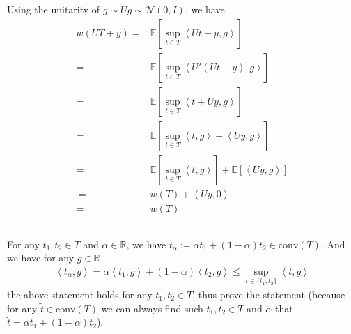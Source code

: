 \documentclass[11pt,a4paper]{ctexart}
\numberwithin{equation}{section}%
\begin{document}
    
\subsection{}

Using the unitarity of $ g \sim Ug \sim \mathcal{N}(0,I) $, we have
\begin{align*}
    w(UT+y)=& \mathbb{E}\left[ \mathop{ \sup  }\limits_{t\in T} \left\langle Ut+y, g \right\rangle   \right]  \\
    =& \mathbb{E}\left[ \mathop{ \sup  }\limits_{t\in T} \left\langle U'(Ut+y), g  \right\rangle   \right]  \\
    =& \mathbb{E}\left[ \mathop{ \sup  }\limits_{t\in T} \left\langle t + Uy, g  \right\rangle   \right]  \\
    =& \mathbb{E}\left[ \mathop{ \sup  }\limits_{t\in T} \left\langle t, g  \right\rangle + \left\langle Uy, g \right\rangle   \right]  \\
    =& \mathbb{E}\left[ \mathop{ \sup  }\limits_{t\in T} \left\langle t, g  \right\rangle  \right] + \mathbb{E}\left[ \left\langle Uy, g \right\rangle  \right]  \\\
    =& w(T) + \left\langle Uy, 0 \right\rangle  \\
    =& w(T)
\end{align*}


\subsection{}

For any $ t_1,t_2\in T $ and $ \alpha \in \mathbb{R} $, we have $ t_\alpha  := \alpha t_1 + (1-\alpha )t_2\in \mathrm{conv}(T) $. And we have for any $ g\in \mathbb{R } $
\begin{align*}
     \left\langle t_\alpha , g \right\rangle = \alpha \left\langle t_1, g \right\rangle + (1-\alpha )\left\langle t_2, g \right\rangle \leq \sup_{t\in \{t_1,t_2\}} \left\langle t, g \right\rangle
\end{align*}
the above statement holds for any $ t_1,t_2\in T $, thus prove the statement (because for any $ \tilde{t}\in \mathrm{conv}(T) $ we can always find such $ t_1,t_2\in T $ and $ \alpha  $ that $ \tilde{t} = \alpha t_1 + (1-\alpha )t_2 $).


\subsection{}
\end{document}
